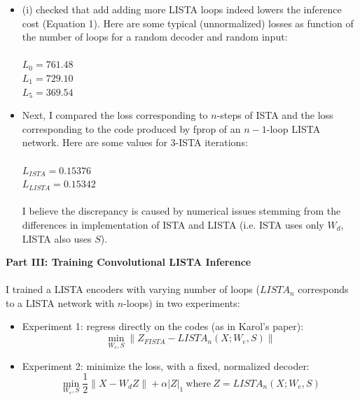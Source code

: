 \documentclass[12pt,a4paper]{report}
\begin{document}
\begin{itemize} 
\item {(i) checked that add adding more LISTA loops indeed lowers the inference cost (Equation 1). Here are some typical (unnormalized) losses as function of the number of loops for a random decoder and random input:\\ \\
$L_0 = 761.48$\\
$L_1 = 729.10$\\
$L_5 = 369.54$}
\item{Next, I compared the loss corresponding to $n$-steps of ISTA and the loss corresponding to the code produced by fprop of an $n-1$-loop LISTA network. Here are some values for 3-ISTA iterations: \\ \\
$L_{ISTA} = 0.15376$\\
$L_{LISTA} = 0.15342$} \\ \\ I believe the discrepancy is caused by numerical issues stemming from the differences in implementation of ISTA and LISTA (i.e. ISTA uses only $W_d$, LISTA also uses $S$). 
\end{itemize} 
 

{\bf Part III: Training Convolutional LISTA Inference} \\ \\
I trained a LISTA encoders with varying number of loops ($LISTA_n$ corresponds to a LISTA network with $n$-loops) in two experiments: 
\begin{itemize} 
\item Experiment 1: regress directly on the codes (as in Karol's paper): 
\begin{equation} 
\nonumber 
\min_{W_e,S} \|Z_{FISTA} - LISTA_n(X;W_e,S) \|
\end{equation}  
\item Experiment 2: minimize the loss, with a fixed, normalized decoder: 
\begin{equation} 
\nonumber
\min_{W_e,S} \frac{1}{2} \|X - W_d Z\| + \alpha |Z|_1 ~ \mbox{where}~ Z = LISTA_n(X;W_e,S)
\end{equation}
\end{itemize} 
\end{document}
